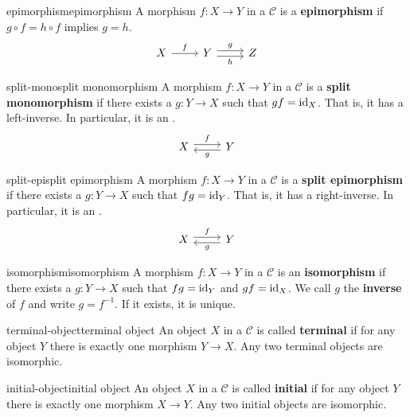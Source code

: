 \begin{topic}{epimorphism}{epimorphism}
    A morphism $f : X \to Y$ in a  $\mathcal{C}$ is a \textbf{epimorphism} if $g \circ f = h \circ f$ implies $g = h$.
    \[ \begin{tikzcd} X \arrow{r}{f} & Y \arrow[shift left=0.25em]{r}{g} \arrow[shift right=0.25em, swap]{r}{h} & Z \end{tikzcd} \]
\end{topic}

\begin{topic}{split-mono}{split monomorphism}
    A morphism $f : X \to Y$ in a  $\mathcal{C}$ is a \textbf{split monomorphism} if there exists a $g : Y \to X$ such that $gf = \text{id}_X$. That is, it has a left-inverse. In particular, it is an .
    \[ \begin{tikzcd} X \arrow[shift left=0.25em]{r}{f} & Y \arrow[shift left=0.25em]{l}{g} \end{tikzcd} \]
\end{topic}

\begin{topic}{split-epi}{split epimorphism}
    A morphism $f : X \to Y$ in a  $\mathcal{C}$ is a \textbf{split epimorphism} if there exists a $g : Y \to X$ such that $fg = \text{id}_Y$. That is, it has a right-inverse. In particular, it is an .
    \[ \begin{tikzcd} X \arrow[shift left=0.25em]{r}{f} & Y \arrow[shift left=0.25em]{l}{g} \end{tikzcd} \]
\end{topic}

\begin{topic}{isomorphism}{isomorphism}
    A morphism $f : X \to Y$ in a  $\mathcal{C}$ is an \textbf{isomorphism} if there exists a $g : Y \to X$ such that $fg = \text{id}_Y$ and $gf = \text{id}_X$. We call $g$ the \textbf{inverse} of $f$ and write $g = f^{-1}$. If it exists, it is unique.
\end{topic}

\begin{topic}{terminal-object}{terminal object}
    An object $X$ in a  $\mathcal{C}$ is called \textbf{terminal} if for any object $Y$ there is exactly one morphism $Y \to X$. Any two terminal objects are isomorphic.
\end{topic}

\begin{topic}{initial-object}{initial object}
    An object $X$ in a  $\mathcal{C}$ is called \textbf{initial} if for any object $Y$ there is exactly one morphism $X \to Y$. Any two initial objects are isomorphic.
\end{topic}

